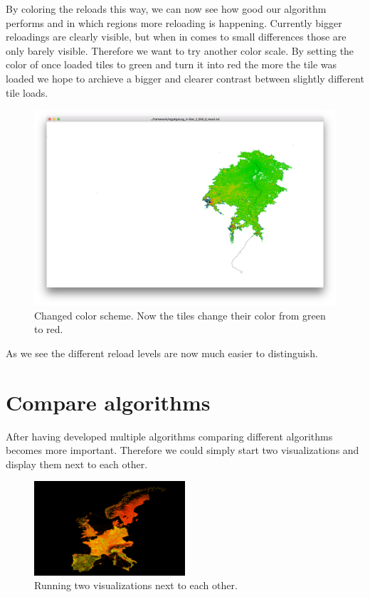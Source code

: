 \documentclass
[
	paper = a4,
    pagesize,
	12 pt,
	oneside,                       %
    open = right,
	DIV = calc,
	BCOR = 0 mm,                   %
	bibtotoc
]
{scrbook}
\begin{document}
By coloring the reloads this way, we can now see how good our algorithm performs and in which regions more reloading is happening.
Currently bigger reloadings are clearly visible, but when in comes to small differences those are only barely visible.
Therefore we want to try another color scale.
By setting the color of once loaded tiles to green and turn it into red the more the tile was loaded we hope to archieve a bigger and clearer contrast between slightly different tile loads.

\begin{figure}[H]
	\includegraphics[width=\textwidth]{Images/vis-hsv-cache.png}
\caption[]{Changed color scheme. Now the tiles change their color from green to red.}
\label{fig:reload_coloring_white}
\end{figure}


As we see the different reload levels are now much easier to distinguish.


\section{Compare algorithms}

After having developed multiple algorithms comparing different algorithms becomes more important.
Therefore we could simply start two visualizations and display them next to each other.

\begin{figure}[H]
	\includegraphics[width=0.5\textwidth]{Images/placeholder.png}
\caption[]{Running two visualizations next to each other.}
\label{fig:two_visualization}
\end{figure}
\end{document}
